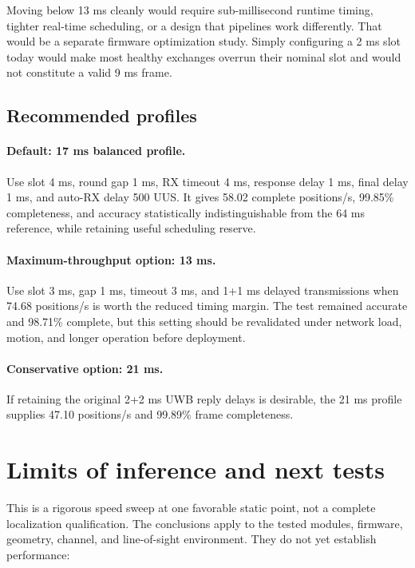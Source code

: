 \documentclass[11pt,a4paper]{article}
\begin{document}
Moving below 13 ms cleanly would require sub-millisecond runtime timing,
tighter real-time scheduling, or a design that pipelines work differently.
That would be a separate firmware optimization study. Simply configuring a
2 ms slot today would make most healthy exchanges overrun their nominal slot
and would not constitute a valid 9 ms frame.

\subsection{Recommended profiles}

\paragraph{Default: 17 ms balanced profile.}
Use slot 4 ms, round gap 1 ms, RX timeout 4 ms, response delay 1 ms, final
delay 1 ms, and auto-RX delay 500 UUS. It gives 58.02 complete positions/s,
99.85\% completeness, and accuracy statistically indistinguishable from the
64 ms reference, while retaining useful scheduling reserve.

\paragraph{Maximum-throughput option: 13 ms.}
Use slot 3 ms, gap 1 ms, timeout 3 ms, and 1+1 ms delayed transmissions when
74.68 positions/s is worth the reduced timing margin. The test remained
accurate and 98.71\% complete, but this setting should be revalidated under
network load, motion, and longer operation before deployment.

\paragraph{Conservative option: 21 ms.}
If retaining the original 2+2 ms UWB reply delays is desirable, the 21 ms
profile supplies 47.10 positions/s and 99.89\% frame completeness.

\section{Limits of inference and next tests}

This is a rigorous speed sweep at one favorable static point, not a complete
localization qualification. The conclusions apply to the tested modules,
firmware, geometry, channel, and line-of-sight environment. They do not yet
establish performance:
\end{document}
